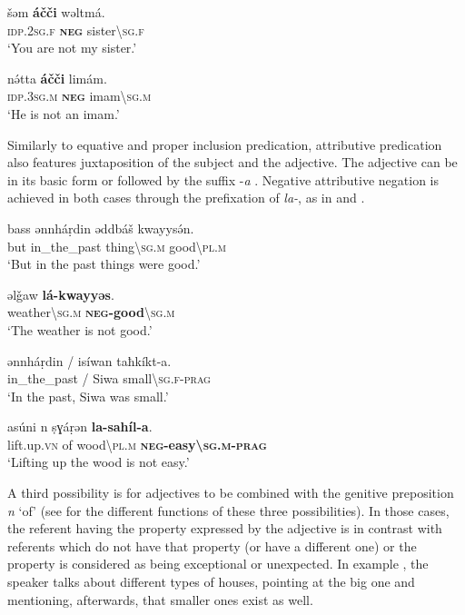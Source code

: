 \documentclass[output=paper,colorlinks,citecolor=brown]{langscibook}
\begin{document}
\ea\label{ex:siw:19}
    \gll šəm \textbf{áčči} wəltmá. \\
         \textsc{idp.2sg.f} \textbf{\textsc{neg}} sister{\textbackslash}\textsc{sg.f} \\
    \glt ‘You are not my sister.’
    \z

\ea\label{ex:siw:20}
    \gll nə́tta \textbf{áčči} limám. \\
         \textsc{idp.3sg.m} \textbf{\textsc{neg}} imam{\textbackslash}\textsc{sg.m}\\
    \glt ‘He is not an imam.’
    \z

 Similarly to equative and proper inclusion predication, attributive predication also features juxtaposition of the subject and the adjective. The adjective can be in its basic form  or followed by the suffix -\textit{a} . Negative attributive negation is achieved in both cases through the prefixation of \textit{la-}, as in  and .

\ea\label{ex:siw:21}
    \ea\label{ex:siw:21a}
        \gll bass ənnh\'{a}ṛdin əddbáš kwayysə́n. \\ 
             but in\_the\_past thing{\textbackslash}\textsc{sg.m} good{\textbackslash}\textsc{pl.m} \\
        \glt ‘But in the past things were good.’
    
    \ex\label{ex:siw:21b}
        \gll əlǧaw \textbf{lá-kwayyəs}. \\
             weather{\textbackslash}\textsc{sg.m} \textbf{\textsc{neg-}good}{\textbackslash}\textsc{sg.m}\\
        \glt ‘The weather is not good.’
    \z
\z 

\ea\label{ex:siw:22}
    \ea\label{ex:siw:22a}
        \gll ənnháṛdin / isíwan taħk\'{i}kt-a. \\ 
             in\_the\_past / Siwa small{\textbackslash}\textsc{sg.f-prag} \\
        \glt ‘In the past, Siwa was small.’
    
    \ex\label{ex:siw:22b}
        \gll asúni n ṣɣáṛən \textbf{la-sahíl-a}. \\
             lift.up.\textsc{vn} of wood{\textbackslash}\textsc{pl.m} \textbf{\textsc{neg}{}-easy{\textbackslash}\textsc{sg.m-prag}} \\
        \glt ‘Lifting up the wood is not easy.’
    \z
\z 

A third possibility is for adjectives to be combined with the genitive preposition \textit{n} ‘of’ (see \citealt{Schiattarella2020} for the different functions of these three possibilities). In those cases, the referent having the property expressed by the adjective is in contrast with referents which do not have that property (or have a different one) or the property is considered as being exceptional or unexpected. In example , the speaker talks about different types of houses, pointing at the big one and mentioning, afterwards, that smaller ones exist as well.
\end{document}
